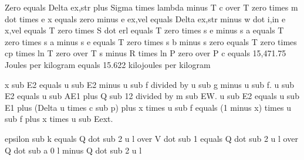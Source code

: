 Zero equals Delta ex,str plus Sigma times lambda minus T c over T zero times m dot times e x equals zero minus e ex,vel equals Delta ex,str minus w dot i,in e x,vel equals T zero times S dot erl equals T zero times s e minus s a equals T zero times s a minus s e equals T zero times s b minus s zero equals T zero times cp times ln T zero over T s minus R times ln P zero over P c equals 15,471.75 Joules per kilogram equals 15.622 kilojoules per kilogram

x sub E2 equals u sub E2 minus u sub f divided by u sub g minus u sub f.  
u sub E2 equals u sub AE1 plus Q sub 12 divided by m sub EW.  
u sub E2 equals u sub E1 plus (Delta u times c sub p) plus x times u sub f equals (1 minus x) times u sub f plus x times u sub Eext.

epsilon sub k equals Q dot sub 2 u l over V dot sub 1 equals Q dot sub 2 u l over Q dot sub a 0 l minus Q dot sub 2 u l